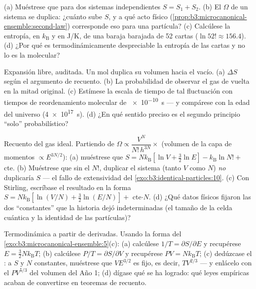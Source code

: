 \begin{exercise}[$\star$]\label{exo:b3:microcanonical-ensemble:3}
(a) Muéstrese que para dos sistemas independientes $S = S_1 + S_2$. (b) El
$\Omega$ de un sistema se duplica: ¿cuánto sube $S$, y a qué
acto físico (\cref{prop:b3:microcanonical-ensemble:second-law})
corresponde eso para una partícula? (c) Calcúlese la entropía,
en $k_{\text{B}}$ y en J/K, de una baraja barajada de 52 cartas
($\ln52! \approx 156.4$). (d) ¿Por qué es termodinámicamente despreciable
la entropía de las cartas y no lo es la molecular?
\end{exercise}

\begin{exercise}[$\star$]\label{exo:b3:microcanonical-ensemble:4}
Expansión libre, auditada. Un mol duplica su volumen hacia el vacío.
(a) $\Delta S$ según el argumento de recuento. (b) La probabilidad de
observar el gas de vuelta en la mitad original. (c) Estímese la escala de
tiempo de tal fluctuación con tiempos de reordenamiento molecular de
\qty{e-10}{s} --- y compárese con la edad del universo
(\qty{4e17}{s}). (d) ¿En qué sentido preciso es el segundo principio
``solo'' probabilístico?
\end{exercise}

\begin{exercise}[$\star\star$]\label{exo:b3:microcanonical-ensemble:5}
Recuento del gas ideal. Partiendo de
$\Omega \propto \dfrac{V^N}{N!\,h^{3N}}\times$ (volumen de la capa de
momentos $\propto E^{3N/2}$): (a) muéstrese que $S = Nk_{\text{B}}[\ln V +
\tfrac32\ln E] - k_{\text{B}}\ln N! + $ cte. (b) Muéstrese que
sin el $N!$, duplicar el sistema (tanto $V$ como $N$) \emph{no}
duplicaría $S$ --- el fallo de extensividad del
\cref{exo:b3:identical-particles:10}. (c) Con Stirling, escríbase el
resultado en la forma $S = Nk_{\text{B}}[\ln(V/N) + \tfrac32\ln(E/N)]
+ $ cte$\cdot N$. (d) ¿Qué datos físicos fijaron las dos
``constantes'' que la historia dejó indeterminadas (el tamaño de la celda
cuántica y la identidad de las partículas)?
\end{exercise}

\begin{exercise}[$\star\star$]\label{exo:b3:microcanonical-ensemble:6}
Termodinámica a partir de derivadas. Usando la forma del
\cref{exo:b3:microcanonical-ensemble:5}(c): (a) calcúlese $1/T =
\partial S/\partial E$ y recupérese $E = \tfrac32 Nk_{\text{B}}T$;
(b) calcúlese $P/T = \partial S/\partial V$ y recupérese $PV =
Nk_{\text{B}}T$; (c) dedúzcase el : a $S$ y $N$
constantes, muéstrese que $VE^{3/2}$ es fijo, es decir, $TV^{2/3}$ --- y
enlácelo con el $PV^{5/3}$ del volumen del Año 1; (d) dígase qué se ha
logrado: qué leyes empíricas acaban de convertirse en teoremas de
recuento.
\end{exercise}

